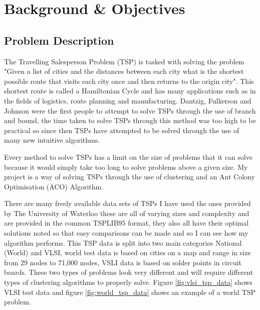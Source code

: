 \chapter{Background \& Objectives}

\section{Problem Description}

The Travelling Salesperson Problem (TSP) is tasked with solving the problem "Given a list of cities and the distances between each city what is the shortest possible route that visits each city once and then returns to the origin city". This shortest route is called a Hamiltonian Cycle and has many applications such as in the fields of logistics, route planning and manufacturing\cite{acobook}. Dantzig, Fulkerson and Johnson were the first people to attempt to solve TSPs through the use of branch and bound\cite{dantzig1954solution}, the time taken to solve TSPs through this method was too high to be practical so since then TSPs have attempted to be solved through the use of many new intuitive algorithms.

Every method to solve TSPs has a limit on the size of problems that it can solve because it would simply take too long to solve problems above a given size. My project is a way of solving TSPs through the use of clustering and an Ant Colony Optimisation (ACO) Algorithm.

There are many freely available data sets of TSPs I have used the ones provided by The University of Waterloo\cite{tsp_test_data_2009} these are all of varying sizes and complexity and are provided in the common TSPLIB95 format, they also all have their optimal solutions noted so that easy comparisons can be made and so I can see how my algorithm performs. This TSP data is split into two main categories National (World) and VLSI, world test data is based on cities on a map and range in size from 29 nodes to 71,000 nodes, VSLI data is based on solder points in circuit boards. These two types of problems look very different and will require different types of clustering algorithms to properly solve. Figure \ref{fig:vlsi_tsp_data} shows VLSI test data and figure \ref{fig:world_tsp_data} shows an example of a world TSP problem.

